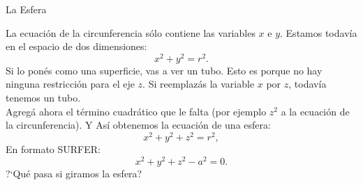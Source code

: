 \documentclass[es]{../../common/SurferDesc}%
\begin{document}
\footnotesize
%
\begin{surferPage}
  \begin{surferTitle}La Esfera\end{surferTitle}
   \begin{surferText}
   
La ecuaci{\'o}n de la circunferencia s{\'o}lo contiene las variables $x$ e $y$. Estamos todav{\'i}a en el espacio de dos dimensiones:
\[x^2+y^2=r^2.\]
Si lo pon{\'e}s como una superficie, vas a ver un tubo. Esto es porque no hay ninguna restricci{\'o}n para el eje $z$. Si reemplaz{\'a}s la variable $x$ por $z$, todav{\'i}a tenemos un tubo.\\
Agreg{\'a} ahora el t{\'e}rmino cuadr{\'a}tico que le falta (por ejemplo $z^2$ a la ecuaci{\'o}n de la circunferencia). 
Y As{\'i} obtenemos la ecuaci{\'o}n de una esfera:
\[x^2+y^2+z^2=r^2,\]
En formato SURFER:
\[x^2+y^2+z^2-a^2=0.\]
?`Qu{\'e} pasa si giramos la esfera?

     \end{surferText}
\end{surferPage}
\end{document}

